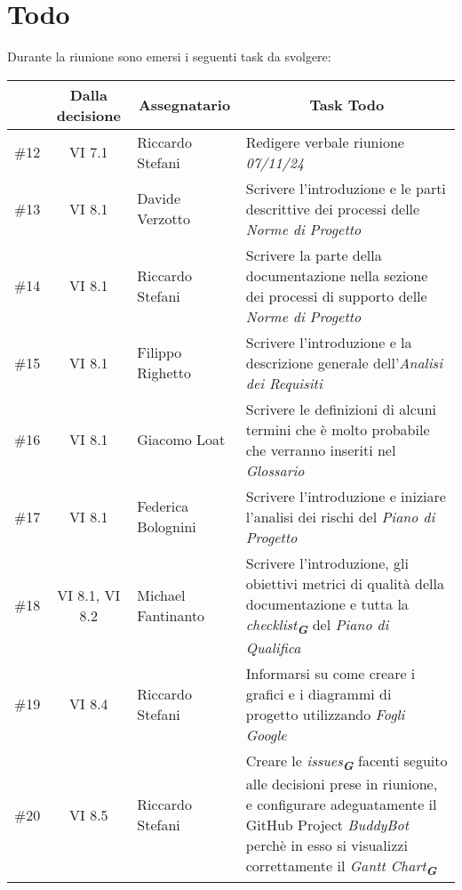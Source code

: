 

\section{Todo}

Durante la riunione sono emersi i seguenti task da svolgere:

\vspace{0.5cm}

\begin{table}[htbp]
\centering
{}
\begin{tabular}{|c|c|p{}|p{}|}
    \hline
    \rowcolor[gray]{0.75}
    \multicolumn{1}{|c|}{\textbf{Codice}} & \multicolumn{1}{|c|}{\textbf{Dalla decisione}} & \multicolumn{1}{|c|}{\textbf{Assegnatario}} 
    & \multicolumn{1}{|c|}{\textbf{Task Todo}} \\
    \hline
    \#12 & VI 7.1 & Riccardo Stefani & Redigere verbale riunione \emph{07/11/24} \\
    \hline
    \#13 & VI 8.1 & Davide Verzotto & Scrivere l'introduzione e le parti descrittive dei processi delle \emph{Norme di Progetto} \\
    \hline
    \#14 & VI 8.1 & Riccardo Stefani & Scrivere la parte della documentazione nella sezione dei processi di supporto delle \emph{Norme di Progetto} \\
    \hline
    \#15 & VI 8.1 & Filippo Righetto & Scrivere l'introduzione e la descrizione generale dell'\emph{Analisi dei Requisiti} \\
    \hline
    \#16 & VI 8.1 & Giacomo Loat & Scrivere le definizioni di alcuni termini che è molto probabile che verranno inseriti nel \emph{Glossario} \\
    \hline
    \#17 & VI 8.1 & Federica Bolognini & Scrivere l'introduzione e iniziare l'analisi dei rischi del \emph{Piano di Progetto} \\
    \hline
    \#18 & VI 8.1, VI 8.2 & Michael Fantinanto & Scrivere l'introduzione, gli obiettivi metrici di qualità della documentazione e tutta
    la \emph{checklist}\textsubscript{\textit{\textbf{G}}} del \emph{Piano di Qualifica} \\
    \hline
    \#19 & VI 8.4 & Riccardo Stefani & Informarsi su come creare i grafici e i diagrammi di progetto utilizzando \emph{Fogli Google} \\
    \hline
    \#20 & VI 8.5 & Riccardo Stefani & Creare le \emph{issues}\textsubscript{\textit{\textbf{G}}} facenti seguito alle decisioni prese in riunione, e 
    configurare adeguatamente il GitHub Project \emph{BuddyBot} perchè in esso si visualizzi correttamente il 
    \emph{Gantt Chart}\textsubscript{\textit{\textbf{G}}} \\
    \hline
\end{tabular}
\end{table}
